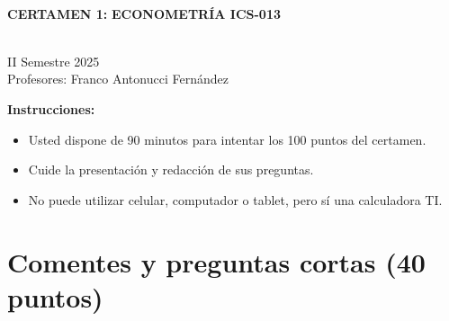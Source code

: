 \documentclass[10pt,a4paper]{article}
\begin{document}
\vspace{5cm}



\begin{center}
\begin{large}
\textbf{\\CERTAMEN 1:}\textbf{ ECONOMETRÍA ICS-013}
\end{large}\\
\vspace{0.2cm}
II Semestre 2025\\
Profesores: Franco Antonucci Fernández\\
\end{center}

\textbf{Instrucciones:} 

\begin{itemize}

    \item Usted dispone de 90 minutos  para intentar los 100 puntos del certamen.
    \item Cuide la presentación y redacción de sus preguntas.
    \item No puede utilizar celular, computador o tablet, pero sí una calculadora TI.
     
\end{itemize}

\section{Comentes y preguntas cortas (40 puntos)}
\end{document}
